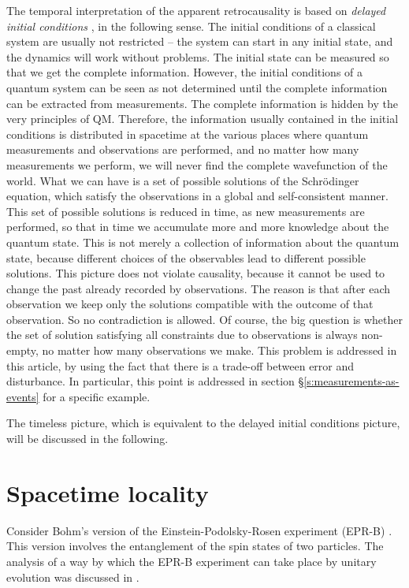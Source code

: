 \documentclass[11pt]{amsart}
\theoremstyle{definition}
\theoremstyle{plain}
\begin{document}
The temporal interpretation of the apparent retrocausality is based on \emph{delayed initial conditions} \cite{Sto08f,Sto12QMc,Sto13bSpringer}, in the following sense. The initial conditions of a classical system are usually not restricted -- the system can start in any initial state, and the dynamics will work without problems. The initial state can be measured so that we get the complete information. However, the initial conditions of a quantum system can be seen as not determined until the complete information can be extracted from measurements. The complete information is hidden by the very principles of QM. Therefore, the information usually contained in the initial conditions is distributed in spacetime at the various places where quantum measurements and observations are performed, and no matter how many measurements we perform, we will never find the complete wavefunction of the world. What we can have is a set of possible solutions of the Schr\"odinger equation, which satisfy the observations in a global and self-consistent manner. This set of possible solutions is reduced in time, as new measurements are performed, so that in time we accumulate more and more knowledge about the quantum state. This is not merely a collection of information about the quantum state, because different choices of the observables lead to different possible solutions.
This picture does not violate causality, because it cannot be used to change the past already recorded by observations. The reason is that after each observation we keep only the solutions compatible with the outcome of that observation. So no contradiction is allowed. Of course, the big question is whether the set of solution satisfying all constraints due to observations is always non-empty, no matter how many observations we make. This problem is addressed in this article, by using the fact that there is a trade-off between error and disturbance. In particular, this point is addressed in section \S\ref{s:measurements-as-events} for a specific example.

The timeless picture, which is equivalent to the delayed initial conditions picture, will be discussed in the following.


\section{Spacetime locality}
\label{s:spacetime_locality}

Consider Bohm's version of the Einstein-Podolsky-Rosen experiment (EPR-B) \cite{EPR35,Bel64}. This version involves the entanglement of the spin states of two particles. The analysis of a way by which the EPR-B experiment can take place by unitary evolution was discussed in \cite{Sto08b,Sto08f,Sto12QMc}.
\end{document}
